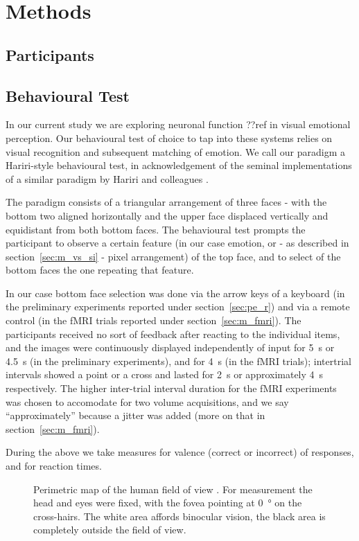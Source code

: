 \chapter{Methods}\label{sec:m}
    \section{Participants}\label{sec:m_p}
    \section{Behavioural Test}\label{sec:m_bt}
	In our current study we are exploring neuronal function ??ref in visual emotional perception.
	Our behavioural test of choice to tap into these systems relies on visual recognition and subsequent matching of emotion.
	We call our paradigm a Hariri-style behavioural test, in acknowledgement of the seminal implementations of a similar paradigm by Hariri and colleagues \citep{Hariri2000,Hariri2003}.
	    
	The paradigm consists of a triangular arrangement of three faces - with the bottom two aligned horizontally and the upper face displaced vertically and equidistant from both bottom faces.
	The behavioural test prompts the participant to observe a certain feature (in our case emotion, or - as described in section~\ref{sec:m_vs_si} - pixel arrangement) of the top face, and to select of the bottom faces the one repeating that feature.
	
	In our case bottom face selection was done via the arrow keys of a keyboard (in the preliminary experiments reported under section~\ref{sec:pe_r}) and via a remote control (in the fMRI trials reported under section~\ref{sec:m_fmri}).
	The participants received no sort of feedback after reacting to the individual items, and the images were continuously displayed independently of input for \SI{5}{\second} or \SI{4.5}{\second} (in the preliminary experiments), and for \SI{4}{\second} (in the fMRI trials); intertrial intervals showed a point or a cross and lasted for \SI{2}{\second} or approximately \SI{4}{\second} respectively.
	The higher inter-trial interval duration for the fMRI experiments was chosen to accomodate for two volume acquisitions, and we say “approximately” because a jitter was added (more on that in section~\ref{sec:m_fmri}). 
	
	During the above we take measures for valence (correct or incorrect) of responses, and for reaction times.
	
	\begin{wrapfigure}{r}{0.45\textwidth}
	  \centering
	    \caption{Perimetric map of the human field of view \citep{Ruch1960}.
	    For measurement the head and eyes were fixed, with the fovea pointing at \SI{0}{\degree} on the cross-hairs.
	    The white area affords binocular vision, the black area is completely outside the field of view.}
	    \label{fig:m_b_1}
	    \vspace{-1.0cm}
	\end{wrapfigure}
	
